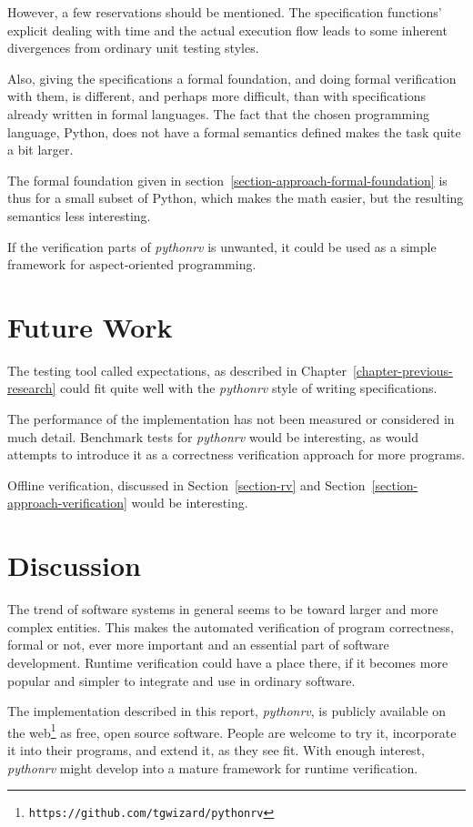\documentclass[a4paper,11pt]{kth-mag}
\begin{document}
However, a few reservations should be mentioned. The specification functions'
explicit dealing with time and the actual execution flow leads to some inherent
divergences from ordinary unit testing styles.

Also, giving the specifications a formal foundation, and doing formal
verification with them, is different, and perhaps more difficult, than with
specifications already written in formal languages. The fact that the chosen
programming language, Python, does not have a formal semantics defined makes the
task quite a bit larger.

The formal foundation given in section~\ref{section-approach-formal-foundation}
is thus for a small subset of Python, which makes the math easier, but the
resulting semantics less interesting.

If the verification parts of \textit{pythonrv} is unwanted, it could be used as
a simple framework for aspect-oriented programming.

\section{Future Work}

The testing tool called expectations, as described in
Chapter~\ref{chapter-previous-research} could fit quite well with the
\textit{pythonrv} style of writing specifications.

The performance of the implementation has not been measured or considered in
much detail. Benchmark tests for \textit{pythonrv} would be interesting, as
would attempts to introduce it as a correctness verification approach for more
programs.

Offline verification, discussed in Section~\ref{section-rv} and
Section~\ref{section-approach-verification} would be interesting.

\section{Discussion}

The trend of software systems in general seems to be toward larger and more
complex entities. This makes the automated verification of program
correctness, formal or not, ever more important and an essential part of
software development. Runtime verification could have a place there, if it
becomes more popular and simpler to integrate and use in ordinary software.

The implementation described in this report, \textit{pythonrv}, is publicly
available on the web\footnote{\texttt{https://github.com/tgwizard/pythonrv}} as
free, open source software. People are welcome to try it, incorporate it into
their programs, and extend it, as they see fit. With enough interest,
\textit{pythonrv} might develop into a mature framework for runtime
verification.
\end{document}
